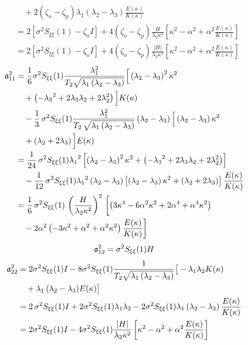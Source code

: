 \begin{enumerate}
\begin{align*}
&\quad + 2 \left(\zeta_o - \zeta_p\right) \lambda_1 \left(\lambda_2 - \lambda_3 \right) \frac{E(\kappa)}{K(\kappa)}\\
&= 2[\sigma^2 S_{\xi\xi}(1) - \zeta_o I] + 4 (\zeta_o-\zeta_p) \frac{H}{\lambda_2{\kappa}^2} \left[ \kappa^2 - \alpha^2 + \alpha^2 \frac{E(\kappa)}{K(\kappa)}\right]\\
&= 2[\sigma^2 S_{\xi\xi}(1) - \zeta_o I] + 4 (\zeta_o-\zeta_p) \frac{|H|}{\lambda_2{\kappa}^2} \left[ \kappa^2 - \alpha^2 + \alpha^2 \frac{E(\kappa)}{K(\kappa)}\right]
\end{align*}
\begin{align*}
\mathfrak a_{11}^2 &= \frac{1}{6}{\sigma}^2 S_{\xi\xi}(1) \frac{\lambda_1^2}{T_2 \sqrt{\lambda_1 \left(\lambda_2 - \lambda_3 \right)}} \Big[\left(\lambda_2 - \lambda_3 \right)^2 \kappa^2\\
&\quad + \left(-{\lambda_3}^2 + 2 \lambda_3 \lambda_2 + 2 \lambda_2^2\right)\Big] K(\kappa)\\
&\quad -\frac{1}{3}\,{\sigma}^2S_{\xi\xi}(1)\frac {\lambda_1^2} {T_2\,\sqrt {\lambda_1\left(\lambda_2 - \lambda_3\right)}}\left(\lambda_2 - \lambda_3\right)\Big[\left(\lambda_2 - \lambda_3\right)\kappa^2\\
&\quad + \left(\lambda_2 + 2 \lambda_3 \right)\Big] E(\kappa)\\
& = \frac{1}{24}\,{\sigma}^2S_{\xi\xi}(1){\lambda_1}^2 \left[\left(\lambda_2-\lambda_3\right)^2 \kappa^2 + \left(-{\lambda_3}^2 + 2 \lambda_3 \lambda_2 + 2 \lambda_2^2\right)\right]\\
&\quad -\frac{1}{12}\,{\sigma}^2S_{\xi\xi}(1){\lambda_1}^2\left(\lambda_2-\lambda_{{ 3}}\right)\left[\left(\lambda_2 - \lambda_3 \right){\kappa}^2 + \left(\lambda_2 + 2 \lambda_3 \right)\right] \frac{E(\kappa)}{K(\kappa)}\\
& = \frac{1}{6}\,{\sigma}^2S_{\xi\xi}(1) \,\left(\frac{H}{\lambda_2{\kappa}^2} \right)^2 \,\biggl[\left( 3 \kappa^4 - 6 \alpha^2 \kappa^2 + 2 \alpha^4 + \alpha^4 \kappa^2\right)\\
&\quad -2 \alpha^2 \left(-3 \kappa^2+\alpha^2 + \alpha^2 \kappa^2\right) \frac{E(\kappa)}{K(\kappa)}\biggr]
\end{align*}
\[
\mathfrak a_{12}^2 = \sigma^2 S_{\xi\xi}(1) H
\]
\begin{align*}
\mathfrak a_{22}^2 & = 2 \sigma^2 S_{\xi\xi}(1){I}-8 \sigma^2 S_{\xi\xi}(1) \frac{1}{T_2 \sqrt{\lambda_1\left(\lambda_2-\lambda_3 \right)}}\big[ - \lambda_1 \lambda_2 K(\kappa)\\
&\quad + {\lambda_1\left(\lambda_2-\lambda_3 \right)} E(\kappa) \big]\\
& =2\,{\sigma}^2S_{\xi\xi}(1){I} + 2 {\sigma}^2 S_{\xi\xi}(1)\lambda_1\lambda_2 - 2 \sigma^2 S_{\xi\xi}(1) \lambda_1 \left(\lambda_2-\lambda_3 \right)\frac{E(\kappa)}{K(\kappa)}\\
& = 2 \sigma^2 S_{\xi\xi}(1) I - 4 \sigma^2 S_{\xi\xi}(1) \frac{|H|}{\lambda_2 \kappa^2} \left[\kappa^2 - \alpha^2 + \alpha^2 \frac{E(\kappa)}{K(\kappa)}\right]
\end{align*}
\end{enumerate}

